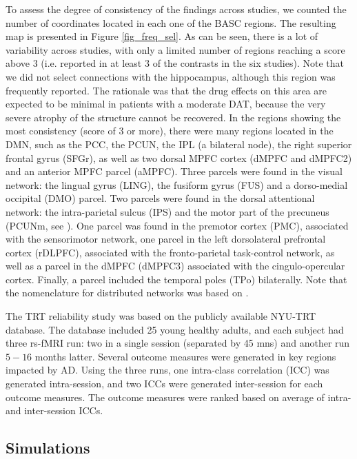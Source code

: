 \documentclass[authoryear]{elsarticle}
\begin{document}
To assess the degree of consistency of the findings across studies, we counted the number of coordinates located in each one of the BASC regions. The resulting map is presented in Figure \ref{fig_freq_sel}. As can be seen, there is a lot of variability across studies, with only a limited number of regions reaching a score above 3 (i.e. reported in at least 3 of the contrasts in the six studies). Note that we did not select connections with the hippocampus, although this region was frequently reported. The rationale was that the drug effects on this area are expected to be minimal in patients with a moderate DAT, because the very severe atrophy of the structure cannot be recovered. In the regions showing the most consistency (score of 3 or more), there were many regions located in the DMN, such as the PCC, the PCUN, the IPL (a bilateral node), the right superior frontal gyrus (SFGr), as well as two dorsal MPFC cortex (dMPFC and dMPFC2) and an anterior MPFC parcel (aMPFC). Three parcels were found in the 
visual network: the lingual gyrus (LING), the fusiform gyrus (FUS) and a dorso-medial occipital (DMO) parcel. Two parcels were found in the dorsal attentional network: the intra-parietal sulcus (IPS) and the motor part of the precuneus (PCUNm, see \cite{Margulies2009}). One parcel was found in the premotor cortex (PMC), associated with the sensorimotor network, one parcel in the left dorsolateral prefrontal cortex (rDLPFC), associated with the fronto-parietal task-control network, as well as a parcel in the dMPFC (dMPFC3) associated with the cingulo-opercular cortex. Finally, a parcel included the temporal poles (TPo) bilaterally. Note that the nomenclature for distributed networks was based on \citep{Power2011}. 

The TRT reliability study was based on the publicly available NYU-TRT database. The database included 25 young healthy adults, and each subject had three rs-fMRI run: two in a single session (separated by 45 mns) and another run $5-16$ months latter. Several outcome measures were generated in key regions impacted by AD. Using the three runs, one intra-class correlation (ICC) was generated intra-session, and two ICCs were generated inter-session for each outcome measures. The outcome measures were ranked based on average of intra- and inter-session ICCs. 

\subsection{Simulations}
\end{document}
